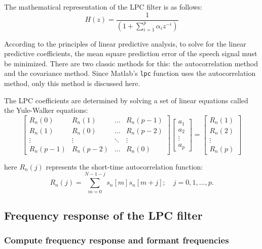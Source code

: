 \documentclass{article}
\begin{document}
The mathematical representation of the LPC filter is as follows\citep{kondoz2005digital}:
\begin{equation}
\label{eqn:LPC}
H(z) = \frac{1}{(1 + \sum_{i=1}^p \alpha_i z^{-i})}
\end{equation}


According to the principles of linear predictive analysis, to solve for the linear predictive coefficients, the mean square prediction error of the speech signal must be minimized. There are two classic methods for this: the autocorrelation method and the covariance method. Since Matlab’s \verb+lpc+ function uses the autocorrelation method, only this method is discussed here.

The LPC coefficients are determined by solving a set of linear equations called the Yule-Walker equations\citep{EEEM030}:
\[
\begin{bmatrix}
\label{bmat:Yule-Walker}
R_{n}(0) & R_{n}(1) & \dots & R_{n}(p-1) \\
R_{n}(1) & R_{n}(0) & \dots & R_{n}(p-2) \\
\vdots  & \vdots  & \ddots  & \vdots  \\
R_{n}(p-1) & R_{n}(p-2) & \dots & R_{n}(0) 
\end{bmatrix}
\begin{bmatrix}
a_1 \\ a_2 \\ \vdots \\ a_p
\end{bmatrix}
=
\begin{bmatrix}
R_{n}(1) \\ R_{n}(2) \\ \vdots \\ R_{n}(p)
\end{bmatrix}
\]

here $R_n(j)$ represents the short-time autocorrelation function\citep{EEEM030}:
\begin{equation}
\label{eqn:autocorrelation}
R_n(j) = \sum_{m=0}^{N-1-j} s_n[m] s_n[m+j]; \quad j = 0, 1, \dots, p.
\end{equation}


\subsection{Frequency response of the LPC filter}

\subsubsection{Compute frequency response and formant frequencies}
\end{document}
